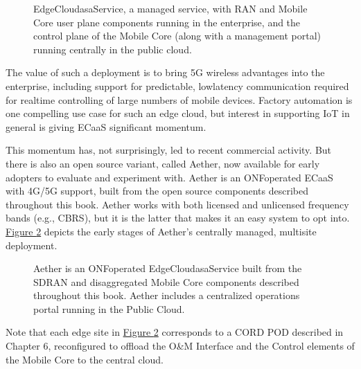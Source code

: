 \documentclass[a4paper,11pt,english]{sphinxmanual}
\let\sphinxpxdimen\pdfpxdimen\else\newdimen\sphinxpxdimen
\begin{document}
\begin{figure}[ht]
\centering
\capstart

\noindent\sphinxincludegraphics[width=700\sphinxpxdimen]{{Slide36}.png}
\caption{EdgeCloud\sphinxhyphen{}as\sphinxhyphen{}a\sphinxhyphen{}Service, a managed service, with RAN and Mobile
Core user plane components running in the enterprise, and the
control plane of the Mobile Core (along with a management portal)
running centrally in the public cloud.}\label{\detokenize{cloud:id2}}\label{\detokenize{cloud:fig-edgecloud}}\end{figure}

\sphinxAtStartPar
The value of such a deployment is to bring 5G wireless advantages into
the enterprise, including support for predictable, low\sphinxhyphen{}latency
communication required for real\sphinxhyphen{}time controlling of large numbers of
mobile devices. Factory automation is one compelling use case for such
an edge cloud, but interest in supporting IoT in general is giving
ECaaS significant momentum.

\sphinxAtStartPar
This momentum has, not surprisingly, led to recent commercial
activity. But there is also an open source variant, called Aether, now
available for early adopters to evaluate and experiment with. Aether
is an ONF\sphinxhyphen{}operated ECaaS with 4G/5G support, built from the open
source components described throughout this book. Aether works with
both licensed and unlicensed frequency bands (e.g., CBRS), but it is
the latter that makes it an easy system to opt into. \hyperref[\detokenize{cloud:fig-aether}]{Figure
\ref{\detokenize{cloud:fig-aether}}} depicts the early stages of Aether’s centrally
managed, multi\sphinxhyphen{}site deployment.

\begin{figure}[ht]
\centering
\capstart

\noindent\sphinxincludegraphics[width=700\sphinxpxdimen]{{Slide37}.png}
\caption{Aether is an ONF\sphinxhyphen{}operated EdgeCloud\sphinxhyphen{}as\sphinxhyphen{}a\sphinxhyphen{}Service built from the
SD\sphinxhyphen{}RAN and disaggregated Mobile Core components described
throughout this book. Aether includes a centralized operations
portal running in the Public Cloud.}\label{\detokenize{cloud:id3}}\label{\detokenize{cloud:fig-aether}}\end{figure}

\sphinxAtStartPar
Note that each edge site in \hyperref[\detokenize{cloud:fig-aether}]{Figure \ref{\detokenize{cloud:fig-aether}}}
corresponds to a CORD POD described in Chapter 6, re\sphinxhyphen{}configured to
offload the O\&M Interface and the Control elements of the Mobile Core
to the central cloud.
\end{document}
